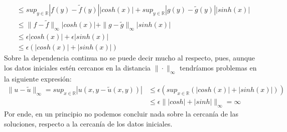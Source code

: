 \begin{homeworkProblem}
\begin{enumerate}[i)]
\begin{solucion}
\begin{align*}
            &\leq sup_{y\in\mathbb{R}}|f(y)-\widetilde{f}(y)||cosh(x)|+sup_{y\in\mathbb{R}}|g(y)-\widetilde{g}(y)||sinh(x)|\\
            &\leq \|f-\widetilde{f}\|_{\infty}|cosh(x)|+\|g-\widetilde{g}\|_{\infty}|sinh(x)|\\
            &\leq \epsilon |cosh(x)|+ \epsilon |sinh(x)|\\
            &\leq \epsilon(|cosh(x)|+|sinh(x)|)
        \end{align*}
        \demostrado
        Sobre la dependencia continua no se puede decir mucho al respecto, pues, aunque los datos iniciales estén cercanos en la distancia $\| \cdot\|_{\infty}$ tendríamos problemas en la siguiente expresión:
        \begin{align*}
            \|u-\widetilde{u}\|_{\infty}=sup_{x\in\mathbb{R}}|u(x,y-\widetilde{u}(x,y))|&\leq \epsilon (sup_{x\in\mathbb{R}}(|cosh(x)|+|sinh(x)|))\\
            &\leq \epsilon \| |cosh|+|sinh| \|_{\infty}=\infty
        \end{align*}
        Por ende, en un principio no podemos concluir nada sobre la cercanía de las soluciones, respecto a la cercanía de los datos iniciales.
    \end{solucion}
\end{enumerate}
\end{homeworkProblem}
\newpage

